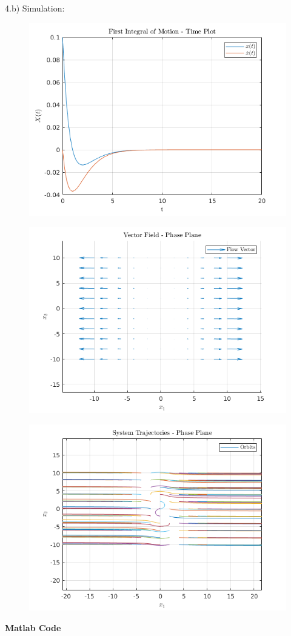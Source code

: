 \documentclass{homeworg}
\begin{document}
4.b) Simulation:
\begin{figure}[h]
  \includegraphics[width=.6\textwidth]{fig04.png}
  \centering
\end{figure}
\begin{figure}[h]
  \includegraphics[width=.6\textwidth]{fig05.png}
  \centering
\end{figure}
\begin{figure}[h]
  \includegraphics[width=.6\textwidth]{fig06.png}
  \centering
\end{figure}
\newpage
\noindent
\textbf{Matlab Code}\\

%
\end{document}
